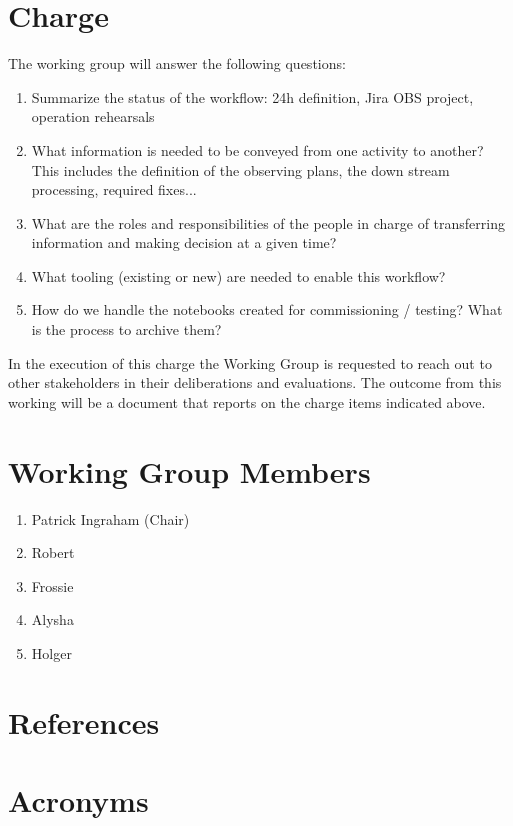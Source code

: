 \documentclass[SE,authoryear,toc]{lsstdoc}
\begin{document}
\section{Charge}
The working group will answer the following questions:
\begin{enumerate}
\item{Summarize the status of the workflow: 24h definition, Jira OBS project, operation rehearsals}
\item{What information is needed to be conveyed from one activity to another? This includes the definition of the observing plans, the down stream processing, required fixes...} 
\item{What are the roles and responsibilities of the people in charge of transferring information and making decision at a given time?}
\item{What tooling (existing or new) are needed  to enable this workflow?}
\item{How do we handle the notebooks created for commissioning / testing? What is the process to archive them?}
\end{enumerate}

In the execution of this charge the Working Group is requested to reach out to other stakeholders in their deliberations and evaluations.
The outcome from this working will be a document that reports on the charge items indicated above.

\section{Working Group Members}
\begin{enumerate}
\item Patrick Ingraham (Chair)
\item Robert
\item Frossie
\item Alysha
\item Holger
\end{enumerate}


\appendix
\section{References} \label{sec:bib}
\renewcommand{\refname}{} %


\section{Acronyms} \label{sec:acronyms}

\end{document}
